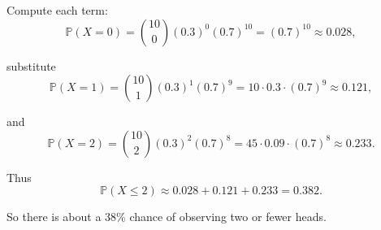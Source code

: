 \documentclass{book}
\begin{document}
Compute each term:
\begin{equation}
	\mathbb{P}(X=0) = \binom{10}{0} (0.3)^0 (0.7)^{10} = (0.7)^{10} \approx 0.028,
\end{equation}

substitute
\begin{equation}
	\mathbb{P}(X=1) = \binom{10}{1} (0.3)^1 (0.7)^9 = 10 \cdot 0.3 \cdot (0.7)^9 \approx 0.121,
\end{equation}

and
\begin{equation}
	\mathbb{P}(X=2) = \binom{10}{2} (0.3)^2 (0.7)^8 = 45 \cdot 0.09 \cdot (0.7)^8 \approx 0.233.
\end{equation}

Thus
\begin{equation}
	\mathbb{P}(X \leq 2) \approx 0.028 + 0.121 + 0.233 = 0.382.
\end{equation}

So there is about a 38\% chance of observing two or fewer heads.
\end{document}
